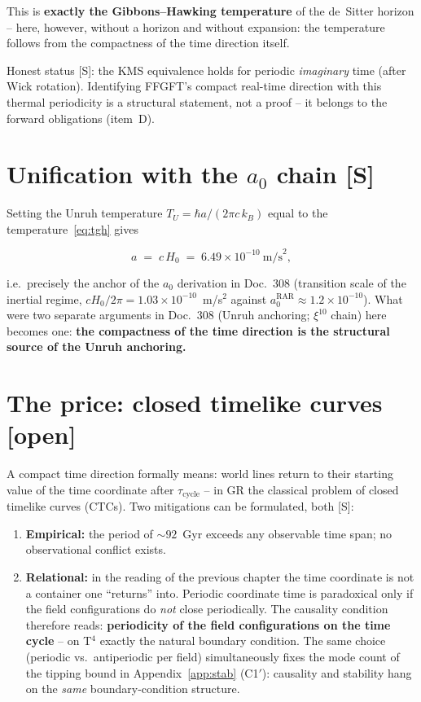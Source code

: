 This is \textbf{exactly the Gibbons--Hawking temperature} of the
de~Sitter horizon -- here, however, without a horizon and without
expansion: the temperature follows from the compactness of the time
direction itself.

Honest status [S]: the KMS equivalence holds for periodic
\emph{imaginary} time (after Wick rotation). Identifying FFGFT's
compact real-time direction with this thermal periodicity is a
structural statement, not a proof -- it belongs to the forward
obligations (item~D).

\section{Unification with the $a_0$ chain [S]}

Setting the Unruh temperature $T_U = \hbar a/(2\pi c\,k_B)$ equal
to the temperature~\eqref{eq:tgh} gives

\begin{equation}
  a \;=\; c\,H_0 \;=\; 6.49\times10^{-10}~\text{m/s}^2,
\end{equation}

i.e.\ precisely the anchor of the $a_0$ derivation in Doc.~308
(transition scale of the inertial regime, $cH_0/2\pi
= 1.03\times10^{-10}$~m/s$^2$ against
$a_0^\text{RAR} \approx 1.2\times10^{-10}$). What were two separate
arguments in Doc.~308 (Unruh anchoring; $\xi^{10}$ chain) here
becomes one: \textbf{the compactness of the time direction is the
structural source of the Unruh anchoring.}

\section{The price: closed timelike curves [open]}

A compact time direction formally means: world lines return to
their starting value of the time coordinate after
$\tau_\text{cycle}$ -- in GR the classical problem of closed
timelike curves (CTCs). Two mitigations can be formulated, both
[S]:

\begin{enumerate}
  \item \textbf{Empirical:} the period of $\sim 92$~Gyr exceeds any
        observable time span; no observational conflict exists.
  \item \textbf{Relational:} in the reading of the previous
        chapter the time coordinate is not a container one
        \enquote{returns} into. Periodic coordinate time is
        paradoxical only if the field configurations do \emph{not}
        close periodically. The causality condition therefore
        reads: \textbf{periodicity of the field configurations on
        the time cycle} -- on T$^4$ exactly the natural boundary
        condition. The same choice (periodic vs.\ antiperiodic per
        field) simultaneously fixes the mode count of the tipping
        bound in Appendix~\ref{app:stab} (C1$'$): causality and stability
        hang on the \emph{same} boundary-condition structure.
\end{enumerate}

